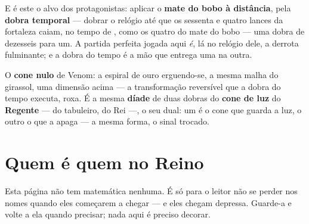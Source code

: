 \documentclass[livro.tex]{subfiles}
\begin{document}
E é este o alvo dos protagonistas: aplicar o \textbf{mate do bobo à distância}, pela
\textbf{dobra temporal} --- dobrar o relógio até que os sessenta e quatro lances da
fortaleza caiam, no tempo de \Ven , como os quatro do mate do bobo --- uma
dobra de dezesseis para um. A partida
perfeita jogada aqui \emph{é}, lá no relógio dele, a derrota fulminante; e a dobra do
tempo é a mão que entrega uma na outra.

O \textbf{cone nulo} de Venom: a espiral de ouro erguendo-se, a mesma malha do girassol,
uma dimensão acima --- a transformação reversível que a dobra do tempo executa, roxa. É a
mesma \textbf{díade} de duas dobras do \textbf{cone de luz} do \textbf{Regente} --- do
tabuleiro, do Rei ---, o seu dual: um é o
cone que guarda a luz, o outro o que a apaga --- a mesma forma, o sinal trocado.


\chapter*{Quem é quem no Reino}

\noindent Esta página não tem matemática nenhuma. É só para o leitor não se perder nos nomes
quando eles começarem a chegar --- e eles chegam depressa. Guarde-a e volte a ela quando
precisar; nada aqui é preciso decorar.
\end{document}
